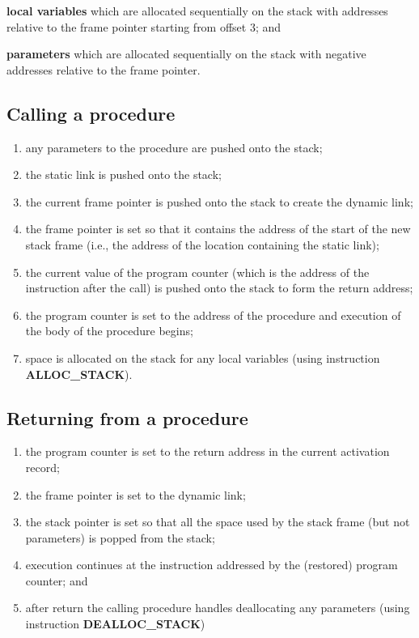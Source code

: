 \documentclass[fontsize=10pt,a4paper]{article}
\begin{document}
\begin{multicols}{3}
    \textbf{local variables} which are allocated sequentially on the stack with addresses relative to the frame pointer starting from offset 3; and

    \textbf{parameters} which are allocated sequentially on the stack with negative addresses relative to the frame pointer.

    \subsection{Calling a procedure}

    \begin{enumerate}
        \item any parameters to the procedure are pushed onto the stack;
        \item the static link is pushed onto the stack;
        \item the current frame pointer is pushed onto the stack to create the dynamic link;
        \item the frame pointer is set so that it contains the address of the start of the new stack frame (i.e., the address of the location containing the static link);
        \item the current value of the program counter (which is the address of the instruction after the call) is pushed onto the stack to form the return address;
        \item the program counter is set to the address of the procedure and execution of the body of the procedure begins;
        \item space is allocated on the stack for any local variables (using instruction \textbf{ALLOC\_STACK}).
    \end{enumerate}

    \subsection{Returning from a procedure}

    \begin{enumerate}
        \item the program counter is set to the return address in the current activation record;
        \item the frame pointer is set to the dynamic link;
        \item the stack pointer is set so that all the space used by the stack frame (but not parameters) is popped from the stack;
        \item execution continues at the instruction addressed by the (restored) program counter; and
        \item after return the calling procedure handles deallocating any parameters (using instruction \textbf{DEALLOC\_STACK})
    \end{enumerate}


\end{multicols}
\end{document}
